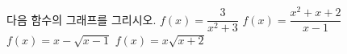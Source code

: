 다음 함수의 그래프를 그리시오.
 $f(x)=\dfrac{3}{x^2+3}$
 $f(x)=\dfrac{x^2+x+2}{x-1}$
 $f(x)=x-\sqrt{x-1}$
 $f(x)=x\sqrt{x+2}$
